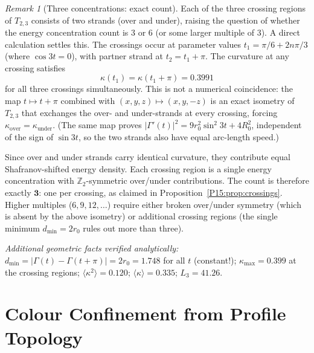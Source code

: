 \documentclass[11pt,a4paper]{article}
\theoremstyle{definition}\newtheorem{definition}[theorem]{Definition}
\theoremstyle{remark}
\newtheorem{remark}[theorem]{Remark}
\begin{document}
\begin{remark}[Three concentrations: exact count]
\label{P15:rem:3or6}
Each of the three crossing regions of $T_{2,3}$ consists of two strands
(over and under), raising the question of whether the energy concentration
count is $3$ or $6$ (or some larger multiple of $3$).
A direct calculation settles this.
The crossings occur at parameter values $t_1=\pi/6+2n\pi/3$ (where $\cos 3t=0$),
with partner strand at $t_2=t_1+\pi$.
The curvature at any crossing satisfies
\begin{equation}
  \kappa(t_1)=\kappa(t_1+\pi)=0.3991
  \label{P15:eq:kappa_equal}
\end{equation}
for all three crossings simultaneously.
This is not a numerical coincidence: the map
$t\mapsto t+\pi$ combined with $(x,y,z)\mapsto(x,y,-z)$
is an exact isometry of $T_{2,3}$ that exchanges the over- and under-strands
at every crossing, forcing $\kappa_{\mathrm{over}}=\kappa_{\mathrm{under}}$.
(The same map proves $|\Gamma'(t)|^2 = 9r_0^2\sin^2 3t + 4R_0^2$,
independent of the sign of $\sin 3t$, so the two strands also have equal
arc-length speed.)

Since over and under strands carry identical curvature, they contribute
equal Shafranov-shifted energy density.
Each crossing region is a single energy concentration with $\mathbb{Z}_2$-symmetric
over/under contributions.
The count is therefore exactly $\mathbf{3}$: one per crossing, as claimed in
Proposition~\ref{P15:prop:crossings}.
Higher multiples ($6, 9, 12, \ldots$) require either broken over/under symmetry
(which is absent by the above isometry) or additional crossing regions
(the single minimum $d_{\min}=2r_0$ rules out more than three).

\smallskip
\noindent\textit{Additional geometric facts verified analytically:}
$d_{\min}=|\Gamma(t)-\Gamma(t+\pi)|=2r_0=1.748$ for all $t$ (constant!);
$\kappa_{\max}=0.399$ at the crossing regions; $\langle\kappa^2\rangle=0.120$;
$\langle\kappa\rangle=0.335$; $L_3=41.26$.
\end{remark}

\section{Colour Confinement from Profile Topology}
\label{P15:sec:confinement}
\end{document}
